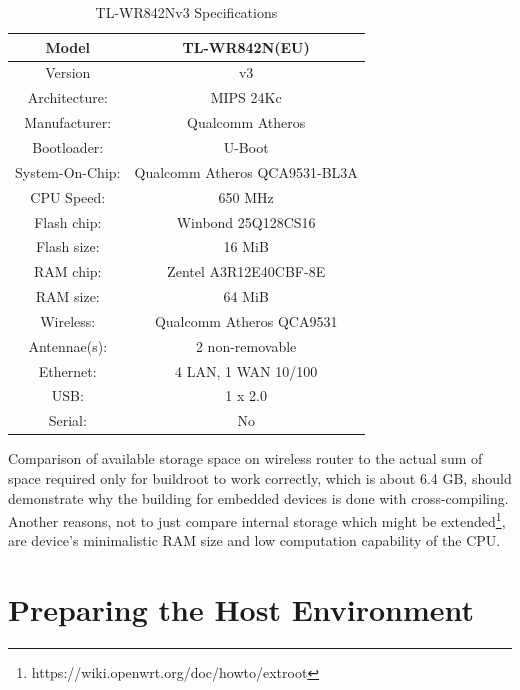 \begin{table}[H]
\centering
\label{routerspec}
\begin{tabular}{c|c}
\hline
Model           &   TL-WR842N(EU)                   \\ \hline
Version         &   v3                              \\ \hline
Architecture:   &   MIPS 24Kc                       \\ \hline
Manufacturer:   &   Qualcomm Atheros                \\ \hline
Bootloader:     &   U-Boot                          \\ \hline
System-On-Chip: &   Qualcomm Atheros QCA9531-BL3A   \\ \hline
CPU Speed:      &   650 MHz                         \\ \hline
Flash chip:     &   Winbond 25Q128CS16              \\ \hline
Flash size:     &   16 MiB                          \\ \hline
RAM chip:       &   Zentel A3R12E40CBF-8E           \\ \hline
RAM size:       &   64 MiB                          \\ \hline
Wireless:       &   Qualcomm Atheros QCA9531        \\ \hline
Antennae(s):    &   2 non-removable                 \\ \hline
Ethernet:       &   4 LAN, 1 WAN 10/100             \\ \hline
USB:            &   1 x 2.0                         \\ \hline
Serial:         &   No                              \\ \hline
\end{tabular}
\caption{TL-WR842Nv3 Specifications}
\end{table}

Comparison of available storage space on wireless router to the actual sum of space required only for buildroot to work correctly, which is about 6.4 GB, should demonstrate why the building for embedded devices is done with cross-compiling.
Another reasons, not to just compare internal storage which might be extended\footnote{https://wiki.openwrt.org/doc/howto/extroot}, are device's minimalistic RAM size and low computation capability of the CPU.



\section{Preparing the Host Environment}

